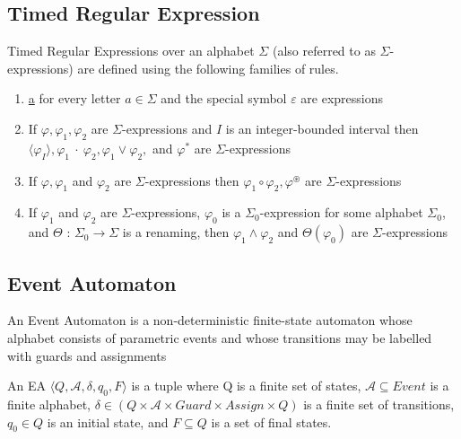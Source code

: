 		\subsection{Timed Regular Expression}
			\begin{dfn}
				Timed Regular Expressions over an alphabet $\Sigma$ (also referred to as $\Sigma$-expressions)
				are defined using the following families of rules.
				\begin{enumerate}
					\item{\underline{a} for every letter $a \in \Sigma$ and the special symbol $\varepsilon$ are expressions}
					\item{If $\varphi, \varphi_1, \varphi_2$ are $\Sigma$-expressions and $I$ is an integer-bounded interval then
						$\langle\varphi_I\rangle, \varphi_1~\cdot~\varphi_2, \varphi_1 \vee \varphi_2,$ and $\varphi^\ast$ are $\Sigma$-expressions}
					\item{If $\varphi, \varphi_1$ and $\varphi_2$ are $\Sigma$-expressions then $\varphi_1 \circ \varphi_2, \varphi^\circledast$ are
						$\Sigma$-expressions}
					\item{If $\varphi_1$ and $\varphi_2$ are $\Sigma$-expressions, $\varphi_0$ is a $\Sigma_0$-expression
						for some alphabet $\Sigma_0$, and $\Theta$ : $\Sigma_0 \rightarrow \Sigma$ is
						a renaming, then $\varphi_1 \wedge \varphi_2$ and $\Theta(\varphi_0)$ are $\Sigma$-expressions}
				\end{enumerate}
			\end{dfn}
			
		
		\subsection{Event Automaton}
			An Event Automaton is a non-deterministic finite-state automaton whose alphabet consists
			of parametric events and whose transitions may be labelled with guards and assignments
			
			\begin{dfn}
				An EA
				$\langle Q,\mathcal{A},\delta, q_0, F \rangle$ is a tuple where Q is a finite set of states, 
				$\mathcal{A} \subseteq Event$ is a finite alphabet,
				$\delta \in (Q \times \mathcal{A} \times Guard \times Assign \times Q)$ is a finite set of transitions, 
				$q_0 \in Q$ is an initial state, and 
				$F \subseteq Q$ is a set of final states.
			\end{dfn}
			
